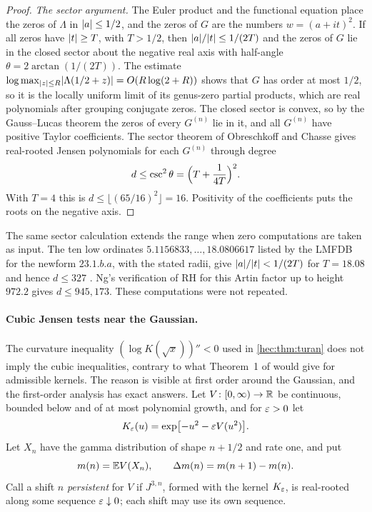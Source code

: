 \begin{proof}
\emph{The sector argument.} The Euler product and the functional equation place the zeros of $\Lambda$ in
$\lvert a\rvert\le1/2$, and the zeros of $G$ are the numbers $w=(a+it)^2$. If all zeros have $\lvert t\rvert\ge T$, with
$T>1/2$, then $\lvert a\rvert/\lvert t\rvert\le1/(2T)$ and the zeros of $G$ lie in the closed sector about the negative
real axis with half-angle $\theta=2\arctan(1/(2T))$. The estimate
$\log\max_{\lvert z\rvert\le R}\lvert\Lambda(1/2+z)\rvert=O(R\log(2+R))$ shows that $G$ has order at most $1/2$, so it is
the locally uniform limit of its genus-zero partial products, which are real polynomials after grouping
conjugate zeros. The closed sector is convex, so by the Gauss--Lucas theorem the zeros of every $G^{(n)}$
lie in it, and all $G^{(n)}$ have positive Taylor coefficients. The sector theorem of Obreschkoff and
Chasse \cite{Chasse2013Laguerre} gives real-rooted Jensen polynomials for each $G^{(n)}$ through degree
\[
 d\le\csc^2\theta=\Bigl(T+\frac1{4T}\Bigr)^2 .
\]
With $T=4$ this is $d\le\lfloor(65/16)^2\rfloor=16$. Positivity of the coefficients puts the roots on the
negative axis.
\end{proof}

The same sector calculation extends the range when zero computations are taken as input. The ten low
ordinates $5.1156833,\dots,18.0806617$ listed by the LMFDB for the newform $23.1.b.a$, with the stated
radii, give $\lvert a\rvert/\lvert t\rvert<1/(2T)$ for $T=18.08$ and hence $d\le327$ \cite{LMFDBDatabase}. Ng's
verification of RH for this Artin factor up to height $972.2$ \cite[\S\S4.3.4--4.3.5]{Ng2000Limiting} gives
$d\le945{,}173$. These computations were not repeated.

\paragraph{Cubic Jensen tests near the Gaussian.}
The curvature inequality $(\log K(\sqrt x))''<0$ used in \cref{hec:thm:turan} does not imply the cubic
inequalities, contrary to what Theorem~1 of \cite{DimitrovLucas2011Higher} would give for admissible
kernels. The reason is visible at first order around the Gaussian, and the first-order analysis has exact
answers. Let $V\colon[0,\infty)\to\mathbb{R}$ be continuous, bounded below and of at most polynomial growth, and for
$\varepsilon>0$ let
\[
 K_\varepsilon(u)=\exp\bigl[-u^2-\varepsilon V(u^2)\bigr].
\]
Let $X_n$ have the gamma distribution of shape $n+1/2$ and rate one, and put
\[
 m(n)=\mathbb{E} V(X_n),\qquad\Delta m(n)=m(n+1)-m(n).
\]
Call a shift $n$ \emph{persistent} for $V$ if $J^{3,n}$, formed with the kernel $K_\varepsilon$, is real-rooted
along some sequence $\varepsilon\downarrow0$; each shift may use its own sequence.

